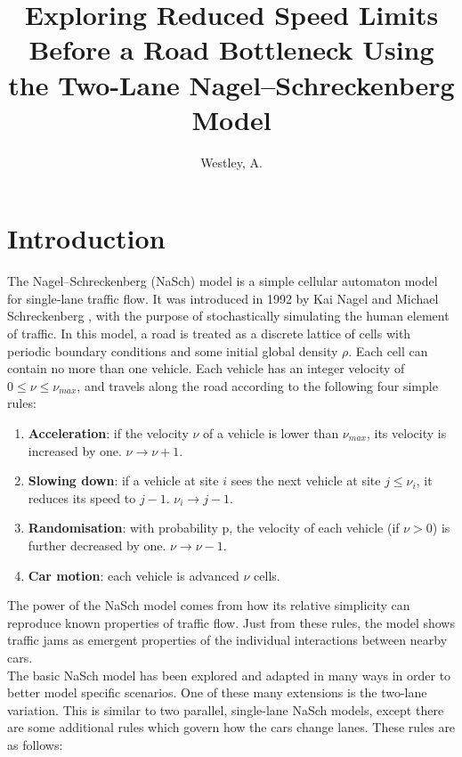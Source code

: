 \documentclass[11pt]{article}
\title{Exploring Reduced Speed Limits Before a Road Bottleneck Using the Two-Lane Nagel--Schreckenberg Model}
\author{Westley, A.}
\begin{document}
	
	\maketitle 
	
	\hfill \break
	
	\section{Introduction} \label{sec:intro}
	
	The Nagel--Schreckenberg (NaSch) model is a simple cellular automaton model for single-lane traffic flow. It was introduced in 1992 by Kai Nagel and Michael Schreckenberg \cite{nagel1992cellular}, with the purpose of stochastically simulating the human element of traffic. In this model, a road is treated as a discrete lattice of cells with periodic boundary conditions and some initial global density $\rho$. Each cell can contain no more than one vehicle. Each vehicle has an integer velocity of $0 \leq \nu \leq \nu_{max}$, and travels along the road according to the following four simple rules: 
	
	\begin{enumerate}
		\item \textbf{Acceleration}: if the velocity $\nu$ of a vehicle is lower than $\nu_{max}$, its velocity is increased by one. $\nu \rightarrow \nu + 1$.
		\item \textbf{Slowing down}: if a vehicle at site $i$ sees the next vehicle at site $j \leq \nu_i$, it reduces its speed to $j-1$. $\nu_i \rightarrow j-1$.
		\item \textbf{Randomisation}: with probability p, the velocity of each vehicle (if $\nu > 0$) is further decreased by one. $\nu \rightarrow \nu - 1$.
		\item \textbf{Car motion}: each vehicle is advanced $\nu$ cells.
	\end{enumerate}
	
	The power of the NaSch model comes from how its relative simplicity can reproduce known properties of traffic flow. Just from these rules, the model shows traffic jams as emergent properties of the individual interactions between nearby cars. \\
	
	The basic NaSch model has been explored and adapted in many ways in order to better model specific scenarios. One of these many extensions is the two-lane variation. This is similar to two parallel, single-lane NaSch models, except there are some additional rules which govern how the cars change lanes\cite{wright2013flow}. These rules are as follows:
	
\end{document}
